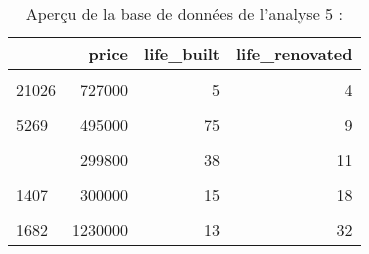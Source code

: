 \documentclass[
  11pt,
  french,
]{article}
\begin{document}
\begin{table}[!h]

\caption{\label{tab:unnamed-chunk-45}Aperçu de la base de données de l'analyse 5 :}
\centering
\begin{tabular}[t]{lrrr}
\toprule
  & price & life\_built & life\_renovated\\
\midrule
\cellcolor{gray!6}{18130} & \cellcolor{gray!6}{382880} & \cellcolor{gray!6}{47} & \cellcolor{gray!6}{13}\\
21026 & 727000 & 5 & 4\\
\cellcolor{gray!6}{7946} & \cellcolor{gray!6}{237000} & \cellcolor{gray!6}{56} & \cellcolor{gray!6}{1}\\
5269 & 495000 & 75 & 9\\
\cellcolor{gray!6}{10116} & \cellcolor{gray!6}{555000} & \cellcolor{gray!6}{10} & \cellcolor{gray!6}{24}\\
\addlinespace
5396 & 299800 & 38 & 11\\
\cellcolor{gray!6}{1569} & \cellcolor{gray!6}{789500} & \cellcolor{gray!6}{9} & \cellcolor{gray!6}{17}\\
1407 & 300000 & 15 & 18\\
\cellcolor{gray!6}{2236} & \cellcolor{gray!6}{220000} & \cellcolor{gray!6}{41} & \cellcolor{gray!6}{0}\\
1682 & 1230000 & 13 & 32\\
\bottomrule
\end{tabular}
\end{table}

\begin{table}[!h]

\caption{\label{tab:unnamed-chunk-46}Comparaison des performances des régressions linéaires de l'analyse 5}
\centering
{}
\end{table}
\end{document}
